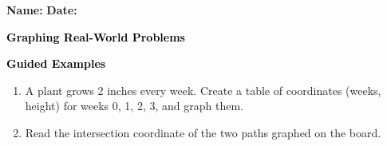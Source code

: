 \documentclass[12pt, letterpaper, fleqn]{article}
\begin{document}
\textbf{Name:} \underline{\hspace{5cm}}
\hfill
\textbf{Date:} \underline{\hspace{3cm}}\\

\begin{tcolorbox}[colback=customteal!20]
    \large\textcolor{black}{\textbf{Graphing Real-World Problems}}
\end{tcolorbox}
\newpage
\begin{tcolorbox}[colback=customteal!20]
    \large\textcolor{black}{\textbf{Guided Examples}}
\end{tcolorbox}
\begin{enumerate}[itemsep=3.5cm, leftmargin=0.6cm]
\item A plant grows 2 inches every week. Create a table of coordinates (weeks, height) for weeks 0, 1, 2, 3, and graph them.
\vspace{4cm}
\item Read the intersection coordinate of the two paths graphed on the board.
\end{enumerate}
\end{document}
